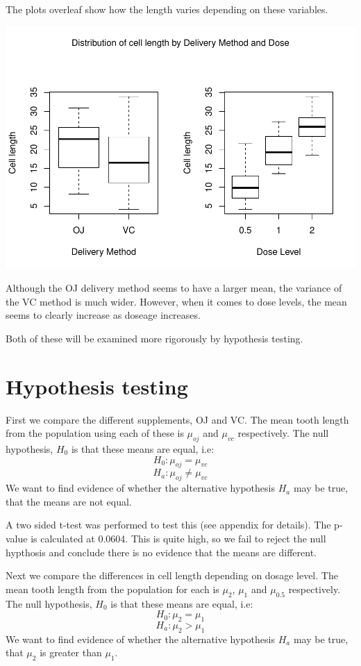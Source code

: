 \documentclass[]{article}
\begin{document}
The plots overleaf show how the length varies depending on these
variables.

\includegraphics{wk4project-inference_files/figure-latex/boxplots-1.pdf}

Although the OJ delivery method seems to have a larger mean, the
variance of the VC method is much wider. However, when it comes to dose
levels, the mean seems to clearly increase as doseage increases.

Both of these will be examined more rigorously by hypothesis testing.

\section{Hypothesis testing}\label{hypothesis-testing}

First we compare the different supplements, OJ and VC. The mean tooth
length from the population using each of these is \(\mu_{oj}\) and
\(\mu_{vc}\) respectively. The null hypothesis, \(H_0\) is that these
means are equal, i.e: \[H_0 : \mu_{oj} = \mu_{vc}\]
\[H_a : \mu_{oj} \neq \mu_{vc}\] We want to find evidence of whether the
alternative hypothesis \(H_a\) may be true, that the means are not
equal.

A two sided t-test was performed to test this (see appendix for
details). The p-value is calculated at 0.0604. This is quite high, so we
fail to reject the null hypthosis and conclude there is no evidence that
the means are different.

\newpage

Next we compare the differences in cell length depending on dosage
level. The mean tooth length from the population for each is \(\mu_2\),
\(\mu_1\) and \(\mu_{0.5}\) respectively. The null hypothesis, \(H_0\)
is that these means are equal, i.e: \[H_0 : \mu_2 = \mu_1\]
\[H_a : \mu_2 > \mu_1\] We want to find evidence of whether the
alternative hypothesis \(H_a\) may be true, that \(\mu_2\) is greater
than \(\mu_1\).
\end{document}
